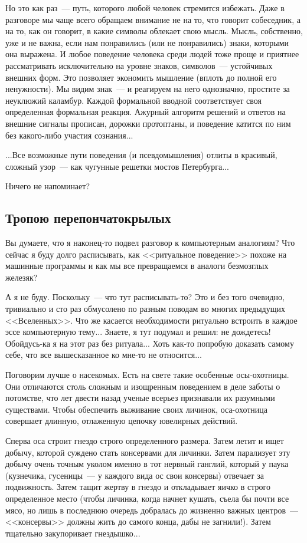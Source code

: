 \documentclass{scrbook}
\newcommand{\flqq}{<<}
\newcommand{\frqq}{>>}
\newcommand{\mdash}{~--- }
\newcommand{\essaysection}[1]{\subsection*{#1}\nopagebreak}
\begin{document}
Но это как раз{\mdash}путь, которого любой человек стремится избежать. Даже в разговоре мы чаще всего обращаем внимание не на то, что говорит собеседник, а на то, как он говорит, в какие символы облекает свою мысль. Мысль, собственно, уже и не важна, если нам понравились (или не понравились) знаки, которыми она выражена. И любое поведение человека среди людей тоже проще и приятнее рассматривать исключительно на уровне знаков, символов{\mdash}устойчивых внешних форм. Это позволяет экономить мышление (вплоть до полной его ненужности). Мы видим знак{\mdash}и реагируем на него однозначно, простите за неуклюжий каламбур. Каждой формальной вводной соответствует своя определенная формальная реакция. Ажурный алгоритм решений и ответов на внешние сигналы прописан, дорожки протоптаны, и поведение катится по ним без какого-либо участия сознания...

...Все возможные пути поведения (и псевдомышления) отлиты в красивый, сложный узор{\mdash}как чугунные решетки мостов Петербурга...

Ничего не напоминает?

\essaysection{Тропою перепончатокрылых}

Вы думаете, что я наконец-то подвел разговор к компьютерным аналогиям? Что сейчас я буду долго расписывать, как {\flqq}ритуальное поведение{\frqq} похоже на машинные программы и как мы все превращаемся в аналоги безмозглых железяк?

А я не буду. Поскольку{\mdash}что тут расписывать-то? Это и без того очевидно, тривиально и сто раз обмусолено по разным поводам во многих предыдущих {\flqq}Вселенных{\frqq}. Что же касается необходимости ритуально встроить в каждое эссе компьютерную тему... Знаете, я тут подумал и решил: не дождетесь! Обойдусь-ка я на этот раз без ритуала... Хоть как-то попробую доказать самому себе, что все вышесказанное ко мне-то не относится...

Поговорим лучше о насекомых. Есть на свете такие особенные осы-охотницы. Они отличаются столь сложным и изощренным поведением в деле заботы о потомстве, что лет двести назад ученые всерьез признавали их разумными существами. Чтобы обеспечить выживание своих личинок, оса-охотница совершает длинную, отлаженную цепочку ювелирных действий.

Сперва оса строит гнездо строго определенного размера. Затем летит и ищет добычу, которой суждено стать консервами для личинки. Затем парализует эту добычу очень точным уколом именно в тот нервный ганглий, который у паука (кузнечика, гусеницы{\mdash}у каждого вида ос свои консервы) отвечает за подвижность. Затем тащит жертву в гнездо и откладывает яичко в строго определенное место (чтобы личинка, когда начнет кушать, съела бы почти все мясо, но лишь в последнюю очередь добралась до жизненно важных центров{\mdash}{\flqq}консервы{\frqq} должны жить до самого конца, дабы не загнили!). Затем тщательно закупоривает гнездышко...
\end{document}
